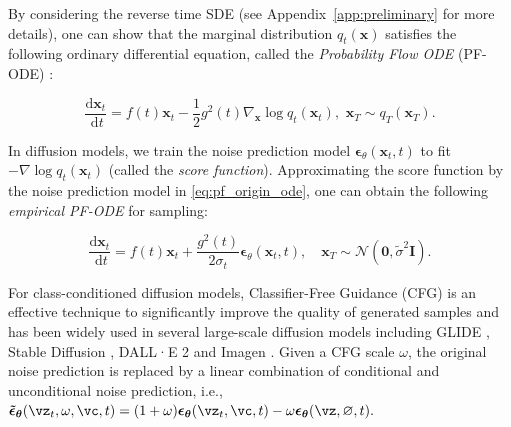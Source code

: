 \documentclass{article} %
\begin{document}
By considering the reverse time SDE (see Appendix~\ref{app:preliminary} for more details), one can show that the marginal distribution $q_t(\boldsymbol{x})$ satisfies the following ordinary differential equation, called the \textit{Probability Flow ODE} (PF-ODE) \citep{song2020score, lu2022dpm}:
\begin{small}
\begin{equation}
    \frac{\mathrm{d} \boldsymbol{x}_t}{\mathrm{~d} t}=f(t) \boldsymbol{x}_t-\frac{1}{2} g^2(t) \nabla_{\boldsymbol{x}} \log q_t\left(\boldsymbol{x}_t\right), \,\, \boldsymbol{x}_T \sim q_T\left(\boldsymbol{x}_T\right). \label{eq:pf_origin_ode}
\end{equation}
\end{small}
In diffusion models, we train the noise prediction model $\boldsymbol{\epsilon}_\theta(\boldsymbol{x}_t, t)$ to fit 
$-\nabla \log q_t(\boldsymbol{x}_t)$ (called the {\em score function}).
Approximating the score function by the noise prediction model in \ref{eq:pf_origin_ode},
one can obtain the following {\em empirical PF-ODE} for sampling:
\begin{small}
\begin{equation}
    \frac{\mathrm{d} \boldsymbol{x}_t}{\mathrm{~d} t}= f(t) \boldsymbol{x}_t+\frac{g^2(t)}{2 \sigma_t} \boldsymbol{\epsilon}_\theta\left(\boldsymbol{x}_t, t\right), \quad \boldsymbol{x}_T \sim \mathcal{N}\left(\mathbf{0}, \tilde{\sigma}^2 \boldsymbol{I}\right).
    \label{eq:pf_empirical_ode}
\end{equation}
\end{small}
For class-conditioned diffusion models, Classifier-Free Guidance (CFG) \citep{ho2022classifier} is an effective technique to significantly improve the quality of generated samples 
and has been widely used in several large-scale diffusion models including GLIDE \cite{Alex2021glide}, Stable Diffusion \citep{rombach2022high}, DALL·E 2 \citep{ramesh2022hierarchical} and Imagen \citep{saharia2022photorealistic}. Given a CFG scale $\omega$, the original noise prediction is replaced by a linear combination of conditional and unconditional noise prediction, i.e., $\bm{\tilde{\epsilon}_\theta}(\vz_t,\omega,\vc,t)=(1+\omega)\bm{\epsilon_\theta}(\vz_t,\vc,t)-\omega\bm{\epsilon_\theta}(\vz,\varnothing,t).$
\end{document}
